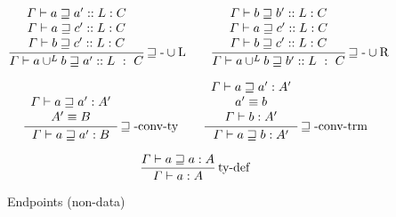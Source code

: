\begin{figure}
  \begin{align*}
    \frac{\begin{array}{c}
    \varGamma\vdash a\sqsupseteq a'::L:C\\
    \varGamma\vdash a\sqsupseteq c'::L:C\\
    \varGamma\vdash b\sqsupseteq c'::L:C
    \end{array}}{\varGamma\vdash a\cup^{L}b\sqsupseteq a'::L\ :\ C}\rulename{\sqsupseteq-\cup L}
    \quad & \quad 
    \frac{\begin{array}{c}
    \varGamma\vdash b\sqsupseteq b'::L:C\\
    \varGamma\vdash a\sqsupseteq c'::L:C\\
    \varGamma\vdash b\sqsupseteq c'::L:C
    \end{array}}{\varGamma\vdash a\cup^{L}b\sqsupseteq b'::L\ :\ C}\rulename{\sqsupseteq-\cup R}
  \\
  \end{align*}
  
  \begin{align*}
    \frac{\begin{array}{c}
    \varGamma\vdash a\sqsupseteq a':A'\\
    A'\equiv B
    \end{array}}{\varGamma\vdash a\sqsupseteq a':B}\operatorname{\sqsupseteq-conv-ty}
    \quad & \quad 
    \frac{\begin{array}{c}
    \varGamma\vdash a\sqsupseteq a':A'\\
    a'\equiv b\\
    \varGamma\vdash b:A'
    \end{array}}{\varGamma\vdash a\sqsupseteq b:A'}\operatorname{\sqsupseteq-conv-trm}
  \\
  \end{align*}
  
  \[
  \frac{\varGamma\vdash a\sqsupseteq a:A}{\varGamma\vdash a:A}\operatorname{ty-def}
  \]
\caption{Endpoints (non-data)}
\label{fig:cast-endpoint-rules}
\end{figure}


